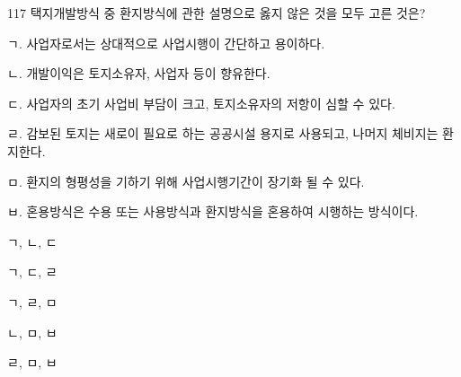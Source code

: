 \begin{question}{117}
택지개발방식 중 환지방식에 관한 설명으로 옳지 않은 것을 모두 고른 것은?
\begin{framedtext}
ㄱ. 사업자로서는 상대적으로 사업시행이 간단하고 용이하다. \par
ㄴ. 개발이익은 토지소유자, 사업자 등이 향유한다. \par
ㄷ. 사업자의 초기 사업비 부담이 크고, 토지소유자의 저항이 심할 수 있다. \par
ㄹ. 감보된 토지는 새로이 필요로 하는 공공시설 용지로 사용되고, 나머지 체비지는 환지한다. \par
ㅁ. 환지의 형평성을 기하기 위해 사업시행기간이 장기화 될 수 있다. \par
ㅂ. 혼용방식은 수용 또는 사용방식과 환지방식을 혼용하여 시행하는 방식이다.
\end{framedtext}
\begin{choices}
  \item ㄱ, ㄴ, ㄷ
  \item ㄱ, ㄷ, ㄹ
  \item ㄱ, ㄹ, ㅁ
  \item ㄴ, ㅁ, ㅂ
  \item ㄹ, ㅁ, ㅂ
\end{choices}
\end{question}
